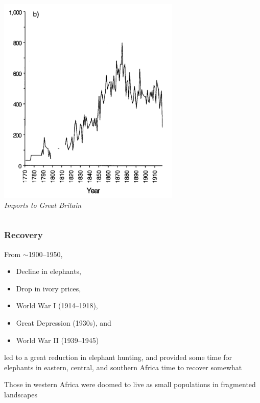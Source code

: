 \documentclass[10pt]{beamer}
\begin{document}
\begin{frame}[t]
\begin{columns}
		\begin{column}{0.5\textwidth}
			\begin{center}
				\includegraphics[width=0.65\textwidth]{figures/british_plot.png}\\
				\emph{\footnotesize{Imports to Great Britain}}
			\end{center}	
		\end{column}
	\end{columns}
\end{frame}


\begin{frame}[t]
\frametitle{Recovery}
\vspace{0.5cm}

	From $\sim$1900--1950,\\
	\smallskip 
	\begin{itemize}
		\item Decline in elephants,
		\smallskip
		\item Drop in ivory prices,
		\smallskip
		\item World War I (1914--1918),
		\smallskip
		\item Great Depression (1930s), and
		\smallskip
		\item World War II (1939--1945) 
	\end{itemize}
	
	\medskip
	
	led to a great reduction in elephant hunting, and provided some time for elephants in eastern, central, and southern Africa time to recover somewhat\\
	
	\vspace{0.5cm}
	
	Those in western Africa were doomed to live as small populations in fragmented landscapes

\end{frame}
\end{document}
